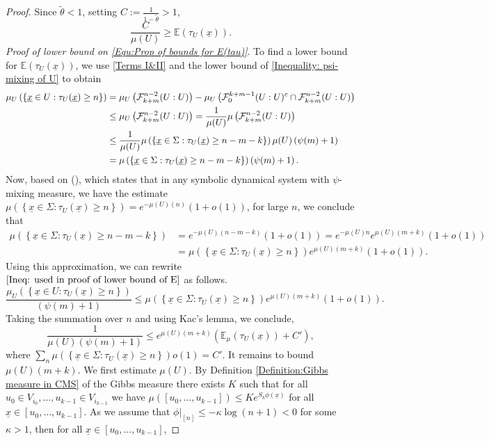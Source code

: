 \documentclass[11pt, reqno]{amsart}
\theoremstyle{plain}%
\theoremstyle{definition}
\theoremstyle{definition}
\def\F{\ensuremath{\mathcal F}}
\def\E{\mathbb E}
\def\ulx{\underline{x}}
\numberwithin{equation}{section}
\begin{document}
\begin{proof}
Since $\tilde{\theta}<1$, setting $C:=\frac{1}{1-\tilde{\theta}}>1$, $$\frac{C}{\mu(U)}\ge \E(\tau_U(\ulx)).$$
\textit{ Proof of lower bound on \eqref{Equ:Prop of bounds for E(tau)}}. To find a lower bound for $ \E(\tau_U(\ulx))$, we use \eqref{Terms I&II} and the lower bound of \eqref{Inequality: psi-mixing of U} to obtain
\begin{align}\label{Ineq: used in proof of lower bound of E}
   \notag \mu_U \left( \left\{\ulx\in U: \tau_U(\ulx)\ge n \right\}\right)& \notag=\mu_U\left(\F_{k+m}^{n-2}(U:U)\right)  -\mu_U\left( {\F_0^{k+m-1}(U:U)^c}\cap \F_{k+m}^{n-2}(U:U) \right)\\& \notag \le \mu_U\left(\F_{k+m}^{n-2}(U:U)\right)=\frac{1}{\mu(U)} \mu\left(\F_{k+m}^{n-2}(U:U)\right) \\&\notag \le \frac{1}{\mu(U)} \mu \left(\left\{\ulx\in \Sigma: \tau_U(\ulx)\ge n-m-k \right\}\right) \mu(U) \left( \psi(m)+1\right)\\&=  \mu \left(\left\{\ulx\in \Sigma: \tau_U(\ulx)\ge n-m-k \right\}\right) \left( \psi(m)+1\right).
\end{align}
Now, based on (\cite[Theorem 3.7]{Saeed}), which states that in any symbolic dynamical system with $\psi$-mixing measure, we have the estimate $\mu \left(\left\{\ulx\in \Sigma: \tau_U(\ulx)\ge n \right\}\right)=  e^{-\mu(U)(n)}(1+o(1))$, for large $n$, we conclude that
\begin{align*}
\mu \left(\left\{\ulx\in \Sigma: \tau_U(\ulx)\ge n-m-k \right\}\right)&=  e^{-\mu(U)(n-m-k)}(1+o(1))=e^{-\mu(U)n}e^{\mu(U)(m+k)}(1+o(1))\\& = \mu \left(\left\{\ulx\in \Sigma: \tau_U(\ulx)\ge n \right\}\right) e^{\mu(U)(m+k)} (1+o(1)).\end{align*}
Using this approximation, we can rewrite $\eqref{Ineq: used in proof of lower bound of E}$ as follows.
$$\frac{\mu_U \left( \left\{\ulx\in U: \tau_U(\ulx)\ge n \right\}\right)}{ \left( \psi(m)+1\right)}\le  \mu \left(\left\{\ulx\in \Sigma: \tau_U(\ulx)\ge n \right\}\right) e^{\mu(U)(m+k)}(1+o(1)).$$
Taking the summation over $n$ and using Kac's lemma, we conclude,
\begin{equation}\label{inequality: proof of lower bound for E_mu}
\frac{1}{ \mu(U)\left( \psi(m)+1\right)}\le e^{\mu(U)(m+k)} (\E_\mu(\tau_U(\ulx))+C'),\end{equation}
where $\sum_n \mu \left( \left\{\ulx\in \Sigma: \tau_U(\ulx)\ge n \right\}\right)o(1)=C'$. It remains to bound $\mu(U)(m+k)$. We first estimate $\mu(U)$. By Definition \ref{Definition:Gibbs measure in CMS} of the Gibbs measure there exists $K$ such that for all $u_0\in V_{i_0},\ldots,u_{k-1}\in V_{i_{k-1}}$ we have $\mu([u_0,\ldots,u_{k-1}])\le K e^{S_k\phi(\underline{x})}$ for all $\underline{x}\in [u_0,\ldots,u_{k-1}]$. As we assume that $\phi\big|_{[n]}\le -\kappa\log (n+1)<0$ for some $\kappa>1$, then for all $\underline{x}\in [u_0,\ldots,u_{k-1}]$, 

\end{proof}
\end{document}
